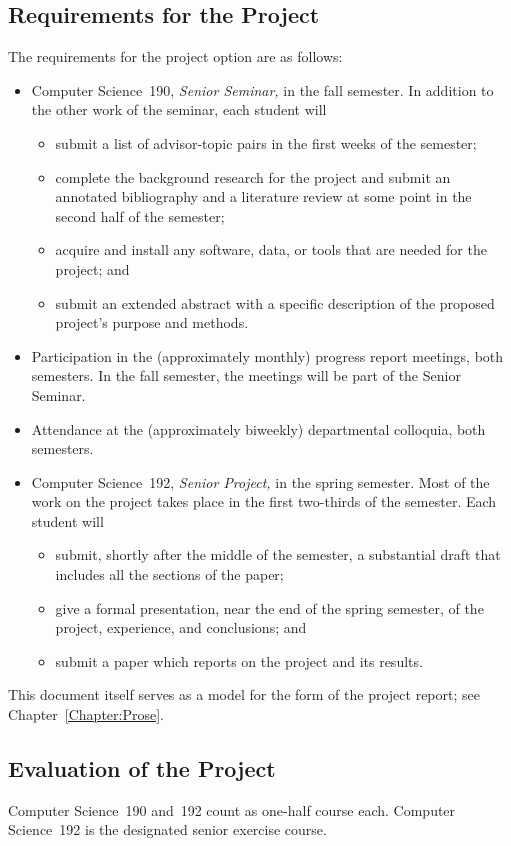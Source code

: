 \documentclass[finalcopy]{srpaper}
\def\hyperref[#1]{}
\let\plainref\ref
\newcommand{\plainref}{\ref*}
\newcommand{\namedref}[2]{\hyperref[#2]{#1~\plainref{#2}}}
\begin{document}
\subsection*{Requirements for the Project}
%
The requirements for the project option are as follows:
\begin{itemize}
\item
Computer Science~190, \textit{Senior Seminar,} in the fall
semester. In addition to the other work of the seminar, each
student will
\begin{itemize}
\item
submit a list of advisor-topic pairs
in the first weeks of the semester;
\item
complete the background research for the project and
submit an annotated bibliography and a literature review
at some point
in the second half of the semester;
\item
acquire and install any software, data, or
tools that are needed for the project; and 
\item
submit an extended abstract with a specific description
of the proposed project's purpose and methods.
\end{itemize}
\item 
Participation in the (approximately monthly) progress
report meetings, both semesters. In the fall semester, the
meetings will be part of the Senior Seminar.
\item
Attendance at the (approximately biweekly) departmental
colloquia, both semesters.
\item
Computer Science~192, \textit{Senior Project,} in the spring
semester. Most of the work on the project takes place in the
first two-thirds of the semester. Each student will
\begin{itemize}
\item
submit, shortly after the middle of the semester, a
substantial draft that includes all the sections of the
paper;
\item
give a formal presentation, near the end of the spring
semester, of the project, experience, and conclusions; and
\item
submit a paper which reports on the project and its results.
\end{itemize}
\end{itemize}
This document itself serves as a model for the form of the
project report; see \namedref{Chapter}{Chapter:Prose}.

\subsection*{Evaluation of the Project}
\label{Section:ProjectEvaluation}
Computer Science~190 and~192 count as one-half course
each. Computer Science~192 is the designated senior exercise
course.
\end{document}
